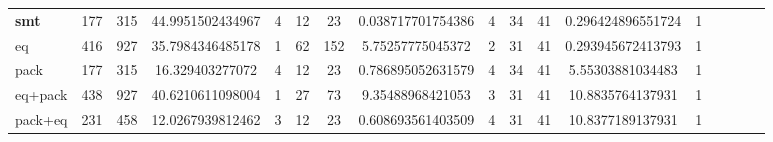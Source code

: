 \begin{tabular}{l*{4}{SSSS}}
\midrule
\textbf{smt}   & 177 & 315 & 44.9951502434967 & 4 & 12 & 23 & 0.038717701754386 & 4 & 34 & 41 & 0.296424896551724 & 1 \\
       eq      & 416 & 927 & 35.7984346485178 & 1 & 62 & 152 & 5.75257775045372 & 2 & 31 & 41 & 0.293945672413793 & 1 \\
       pack    & 177 & 315 & 16.329403277072 & 4 & 12 & 23 & 0.786895052631579 & 4 & 34 & 41 & 5.55303881034483 & 1 \\
       eq+pack & 438 & 927 & 40.6210611098004 & 1 & 27 & 73 & 9.35488968421053 & 3 & 31 & 41 & 10.8835764137931 & 1 \\
       pack+eq & 231 & 458 & 12.0267939812462 & 3 & 12 & 23 & 0.608693561403509 & 4 & 31 & 41 & 10.8377189137931 & 1 \\
\bottomrule
\end{tabular} 
